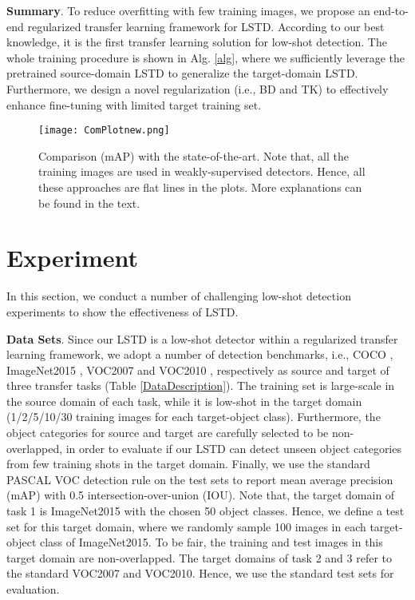 \documentclass[letterpaper]{article} \usepackage{aaai18}  \usepackage{times}  \usepackage{helvet}  \usepackage{courier}  \usepackage{url}  \usepackage{graphicx}
\begin{document}
\textbf{Summary}.
To reduce overfitting with few training images,
we propose an end-to-end regularized transfer learning framework for LSTD.
According to our best knowledge,
it is the first transfer learning solution for low-shot detection.
The whole training procedure is shown in Alg. \ref{alg},
where
we sufficiently leverage the pretrained source-domain LSTD to generalize the target-domain LSTD.
Furthermore,
we design a novel regularization (i.e., BD and TK) to effectively enhance fine-tuning with limited target training set.



\begin{figure*}[t]
\centering
\texttt{[image: ComPlotnew.png]}
\caption{Comparison (mAP) with the state-of-the-art.
Note that,
all the training images are used in weakly-supervised detectors.
Hence,
all these approaches are flat lines in the plots.
More explanations can be found in the text.}
\label{CompareWithStateOfTheArt}
\end{figure*}


\section{Experiment}
In this section,
we conduct a number of challenging low-shot detection experiments to show the effectiveness of LSTD.

\textbf{Data Sets}.
Since our LSTD is a low-shot detector within a regularized transfer learning framework,
we adopt a number of detection benchmarks,
i.e.,
COCO \cite{coco},
ImageNet2015 \cite{imagenet},
VOC2007 and VOC2010 \cite{voc},
respectively as source and target of three transfer tasks (Table \ref{DataDescription}).
The training set is large-scale in the source domain of each task,
while
it is low-shot in the target domain (1/2/5/10/30 training images for each target-object class).
Furthermore,
the object categories for source and target are carefully selected to be non-overlapped,
in order to evaluate if our LSTD can detect unseen object categories from few training shots in the target domain.
Finally,
we use the standard PASCAL VOC detection rule on the test sets to report mean average precision (mAP) with 0.5 intersection-over-union (IOU).
Note that,
the target domain of task 1 is ImageNet2015 with the chosen 50 object classes.
Hence,
we define a test set for this target domain,
where we randomly sample 100 images in each target-object class of ImageNet2015.
To be fair,
the training and test images in this target domain are non-overlapped.
The target domains of task 2 and 3 refer to the standard VOC2007 and VOC2010.
Hence,
we use the standard test sets for evaluation.
\end{document}
